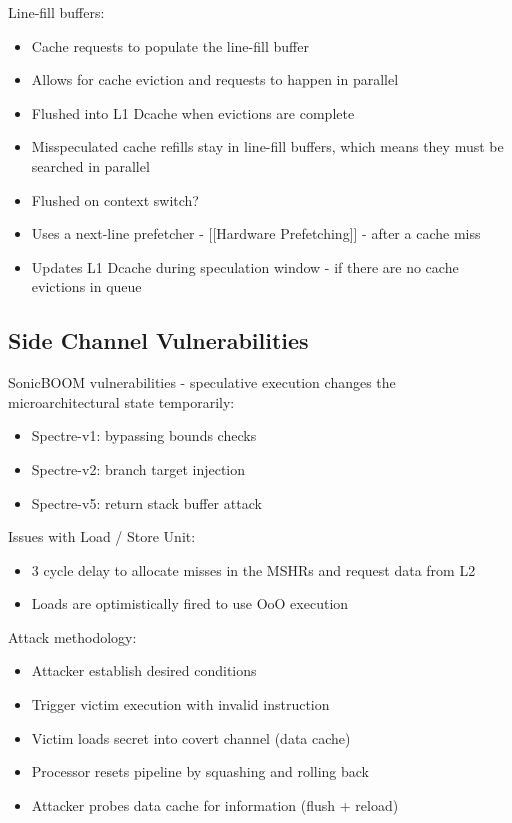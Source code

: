 \documentclass[a4paper, 5pt, twocolumn]{article}
\begin{document}
Line-fill buffers:

\begin{itemize}[topsep=0pt,itemsep=-1ex,partopsep=1ex,parsep=1ex]
	\item Cache requests to populate the line-fill buffer
	\item Allows for cache eviction and requests to happen in parallel
	\item Flushed into L1 Dcache when evictions are complete
	\item Misspeculated cache refills stay in line-fill buffers, which means they must be searched in parallel
	\item Flushed on context switch?
	\item Uses a next-line prefetcher - [[Hardware Prefetching]] - after a cache miss
	\item Updates L1 Dcache during speculation window - if there are no cache evictions in queue \\
\end{itemize}

\hypertarget{sidechannelvulnerabilities}{%
\subsection{Side Channel Vulnerabilities}\label{sidechannelvulnerabilities}}
SonicBOOM vulnerabilities - speculative execution changes the microarchitectural state temporarily:

\begin{itemize}[topsep=0pt,itemsep=-1ex,partopsep=1ex,parsep=1ex]
	\item Spectre-v1: bypassing bounds checks
	\item Spectre-v2: branch target injection
	\item Spectre-v5: return stack buffer attack \\
\end{itemize}

Issues with Load / Store Unit:

\begin{itemize}[topsep=0pt,itemsep=-1ex,partopsep=1ex,parsep=1ex]
	\item 3 cycle delay to allocate misses in the MSHRs and request data from L2
	\item Loads are optimistically fired to use OoO execution \\
\end{itemize}

Attack methodology:
\begin{itemize}[topsep=0pt,itemsep=-1ex,partopsep=1ex,parsep=1ex]
	\item Attacker establish desired conditions
	\item Trigger victim execution with invalid instruction
	\item Victim loads secret into covert channel (data cache)
	\item Processor resets pipeline by squashing and rolling back
	\item Attacker probes data cache for information (flush + reload) \\
\end{itemize}
\end{document}
